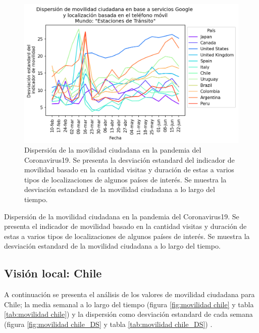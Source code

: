 \documentclass{article}
\begin{document}
\begin{figure}[H]
	\centering
	\begin{adjustbox}{width=0.8\textwidth}
		\includegraphics{./figtab/mundo_DS.png} %
	\end{adjustbox}
	\caption{Dispersión de la movilidad ciudadana en la pandemia del Coronavirus19. Se presenta la desviación estandard del indicador de movilidad basado en la cantidad visitas y duración de estas a varios tipos de localizaciones de algunos países de interés. Se muestra la desviación estandard de la movilidad ciudadana a lo largo del tiempo. }
	\label{fig:movilidad mundial_DS}
\end{figure}


\begin{table}[H]
	\begin{adjustbox}{width=1\textwidth}
	\end{adjustbox}
	\caption{Dispersión de la movilidad ciudadana en la pandemia del Coronavirus19. Se presenta el indicador de movilidad basado en la cantidad visitas y duración de estas a varios tipos de localizaciones de algunos países de interés. Se muestra la desviación estandard de la movilidad ciudadana a lo largo del tiempo.}
	\label{tab:movilidad mundial_DS}
\end{table}

\subsection{Visión local: Chile}

A continuación se presenta el análisis de los valores de movilidad ciudadana para Chile; la media semanal a lo largo del tiempo (figura \ref{fig:movilidad chile} y tabla \ref{tab:movilidad chile}) y la dispersión como desviación estandard de cada semana (figura \ref{fig:movilidad chile_DS} y tabla \ref{tab:movilidad chile_DS}) .
\end{document}
